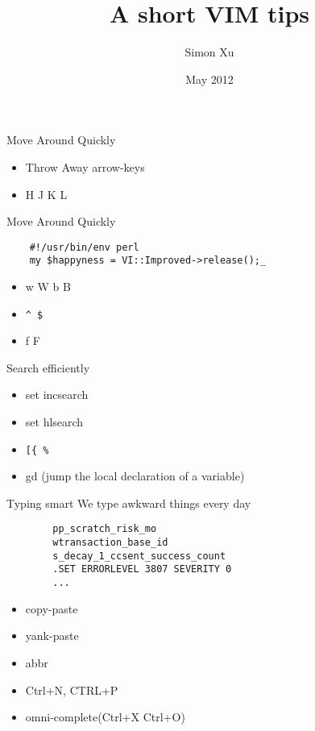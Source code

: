\documentclass[c]{beamer}
\title{A short VIM tips}
\author{Simon Xu}
\institute{PayPal}
\date{May 2012}
\begin{document}
\begin{frame}[plain]
    \titlepage
\end{frame}

\begin{frame}{Move Around Quickly}
    \begin{itemize}
        \pause
        \item Throw Away arrow-keys
        \pause
        \item H {\color{blue}J} K {\color{blue}L}
    \end{itemize}
\end{frame}

\begin{frame}[fragile]{Move Around Quickly}
    \begin{verbatim}
    #!/usr/bin/env perl
    my $happyness = VI::Improved->release();_
    \end{verbatim}
    \pause
    
    \begin{itemize}
        \item w W b B
        \pause
        \item \verb|^ $|
        \pause
        \item f F      
    \end{itemize}
\end{frame}

\begin{frame}[fragile]{Search efficiently}
    \pause
    \begin{itemize}
        \item set incsearch
        \pause
        \item set hlsearch
        \pause
        \item \verb=[{ %= 
        \pause
        \item gd (jump the local declaration of a variable)
    \end{itemize}
\end{frame}

\begin{frame}[fragile]{Typing smart}
    We type awkward things every day
    \pause
    \begin{verbatim}
        pp_scratch_risk_mo
        wtransaction_base_id
        s_decay_1_ccsent_success_count
        .SET ERRORLEVEL 3807 SEVERITY 0
        ...
    \end{verbatim}
    \pause
    
    \begin{itemize}
        \item copy-paste
        \pause
        \item yank-paste
        \pause
        \item abbr
        \pause
        \item Ctrl+N, CTRL+P
        \pause
        \item omni-complete(Ctrl+X Ctrl+O)
    \end{itemize}
\end{frame}
\end{document}
